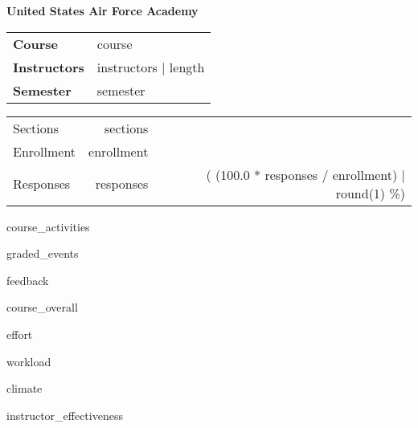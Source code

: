 \documentclass{article}
\begin{document}
{\bfseries\large United States Air Force Academy}

\smallskip  %
\begin{minipage}{0.67\linewidth}
  \begin{tabular}{@{}>{\bfseries}ll}
    Course & {{ course }}\\
    Instructors & {{ instructors | length }}\\
    Semester & {{ semester }}\\
  \end{tabular}
\end{minipage}%
\begin{minipage}{0.33\linewidth}
  \hfill  %
  \begin{tabular}{l rr@{}}
    Sections & {{ sections }}\\
    Enrollment & {{ enrollment }}\\
    Responses & {{ responses }} & ({{ (100.0 * responses / enrollment) | round(1) }}\%)\\
  \end{tabular}
\end{minipage}
\medskip  %

{{ course_activities }}

\clearpage  %
{{ graded_events }}

\clearpage  %
{{ feedback }}

\clearpage  %
{{ course_overall }}

\clearpage  %
{{ effort }}

\clearpage  %
{{ workload }}

\clearpage  %
{{ climate }}

\clearpage  %
{{ instructor_effectiveness }}

\clearpage  %
\end{document}
